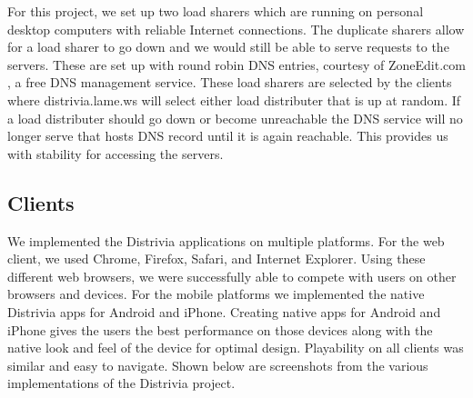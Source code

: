 \documentclass{dependencies/acm_proc_article-sp}
\begin{document}
For this project, we set up two load sharers which are running on personal desktop computers with reliable Internet connections.
The duplicate sharers allow for a load sharer to go down and we would still be able to serve requests to the servers.
These are set up with round robin DNS entries, courtesy of ZoneEdit.com \cite{zoneedit}, a free DNS management service.
These load sharers are selected by the clients where distrivia.lame.ws will select either load distributer that is up at random.
If a load distributer should go down or become unreachable the DNS service will no longer serve that hosts DNS record until it is again reachable.
This provides us with stability for accessing the servers.

\subsection{Clients}
We implemented the Distrivia applications on multiple platforms.
For the web client, we used Chrome, Firefox, Safari, and Internet Explorer.
Using these different web browsers, we were successfully able to compete with users on other browsers and devices.
For the mobile platforms we implemented the native Distrivia apps for Android and iPhone.
Creating native apps for Android and iPhone gives the users the best performance on those devices along with the native look and feel of the device for optimal design.
Playability on all clients was similar and easy to navigate. Shown below are screenshots from the various implementations of the Distrivia project.
\end{document}
